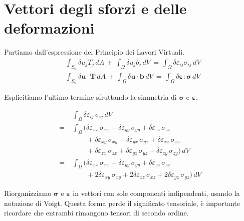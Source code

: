 \section{Vettori degli sforzi e delle deformazioni}

Partiamo dall'espressione del Principio dei Lavori Virtuali.
\begin{align*}
     & \int_{S_{\sigma}}  \delta u_j T_j \, dA  \, +\,\int_{\Omega} \delta u_{j}  b_j  \, dV \, = \, \int_{\Omega} \delta \varepsilon_{ij}  \sigma_{ij}  \, dV   \\
    &  \int_{S_{\sigma}} \delta \mathbf{u} \cdot \mathbf{T} \, dA 
    \,+\, \int_{\Omega} \delta \mathbf{u} \cdot \mathbf{b} \, dV 
    \,=\, \int_{\Omega} \delta \boldsymbol{\varepsilon} : \boldsymbol{\sigma} \, dV
\end{align*}


Esplicitiamo l'ultimo termine sfruttando la simmetria di $\boldsymbol{\sigma}$ e $\boldsymbol{\varepsilon}$.

\begin{align*}
     & \int_{\Omega} \delta \varepsilon_{ij} \, \sigma_{ij} \, dV \\
  =\; & \int_{\Omega} \big( \delta \varepsilon_{xx} \, \sigma_{xx}
     + \delta \varepsilon_{yy} \, \sigma_{yy}
     + \delta \varepsilon_{zz} \, \sigma_{zz} \\
     & \qquad + \delta \varepsilon_{xy} \, \sigma_{xy}
     + \delta \varepsilon_{yx} \, \sigma_{yx}
     + \delta \varepsilon_{xz} \, \sigma_{xz} \\
     & \qquad + \delta \varepsilon_{zx} \, \sigma_{zx}
     + \delta \varepsilon_{yz} \, \sigma_{yz}
     + \delta \varepsilon_{zy} \, \sigma_{zy} \big) \, dV \\
  =\; & \int_{\Omega} \big( \delta \varepsilon_{xx} \, \sigma_{xx}
     + \delta \varepsilon_{yy} \, \sigma_{yy}
     + \delta \varepsilon_{zz} \, \sigma_{zz} \\
     & \qquad + 2 \delta \varepsilon_{xy} \, \sigma_{xy}
     + 2 \delta \varepsilon_{xz} \, \sigma_{xz}
     + 2 \delta \varepsilon_{yz} \, \sigma_{yz} \big) \, dV
\end{align*}


Riorganizziamo  $\boldsymbol{\sigma}$ e $\boldsymbol{\varepsilon}$ in vettori con sole componenti indipendenti, usando la notazione di Voigt. Questa forma perde il significato tensoriale, è importante ricordare che entrambi rimangono tensori di secondo ordine.

